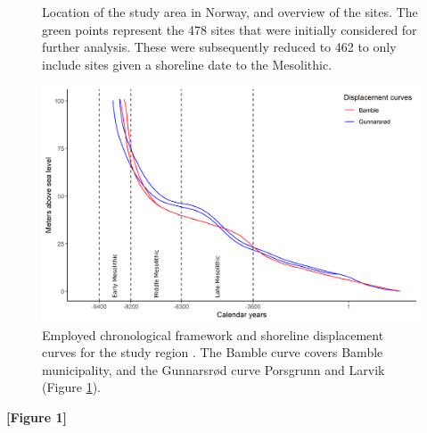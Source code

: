 \documentclass[12pt, a4paper]{article}
\begin{document}
\begin{figure}[h]
	\centering
	\caption{Location of the study area in Norway, and overview of the sites. The green
		points represent the 478 sites that were initially considered for further analysis. These
		were subsequently reduced to 462 to only include sites given a shoreline date to the Mesolithic.}
	\label{fig:overview}
\end{figure}
\begin{figure}[h]
	\centering
	\includegraphics[width = \linewidth]{displacement.png}
	\caption{Employed chronological framework and shoreline displacement curves for the study region \citep[after][]{sorensen2014, sorensen2015}. The Bamble curve covers Bamble municipality, and the Gunnarsr{\o}d curve Porsgrunn and Larvik (Figure \ref{fig:overview}).}
	\label{fig:displacement}
\end{figure}

\smallskip
\textbf{[Figure 1]}
\smallskip
\end{document}

